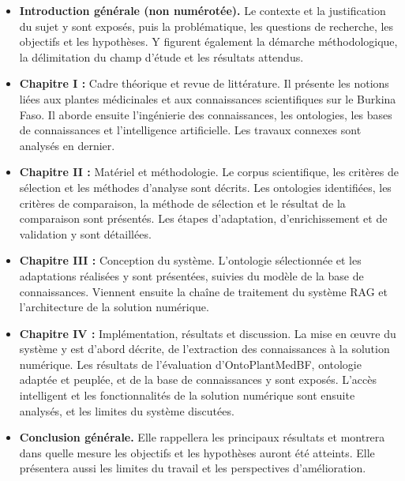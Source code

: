 \begin{itemize}
	\item \textbf{Introduction générale (non numérotée).} Le contexte et la justification du sujet y sont exposés, puis la problématique, les questions de recherche, les objectifs et les hypothèses. Y figurent également la démarche méthodologique, la délimitation du champ d'étude et les résultats attendus.

	\item \textbf{Chapitre I :} Cadre théorique et revue de littérature. Il présente les notions liées aux plantes médicinales et aux connaissances scientifiques sur le Burkina Faso. Il aborde ensuite l'ingénierie des connaissances, les ontologies, les bases de connaissances et l'intelligence artificielle. Les travaux connexes sont analysés en dernier.

	\item \textbf{Chapitre II :} Matériel et méthodologie. Le corpus scientifique, les critères de sélection et les méthodes d'analyse sont décrits. Les ontologies identifiées, les critères de comparaison, la méthode de sélection et le résultat de la comparaison sont présentés. Les étapes d'adaptation, d'enrichissement et de validation y sont détaillées.

	\item \textbf{Chapitre III :} Conception du système. L'ontologie sélectionnée et les adaptations réalisées y sont présentées, suivies du modèle de la base de connaissances. Viennent ensuite la chaîne de traitement du système RAG et l'architecture de la solution numérique.

\item \textbf{Chapitre IV :} Implémentation, résultats et discussion. La mise en œuvre du système y est d'abord décrite, de l'extraction des connaissances à la solution numérique. Les résultats de l'évaluation d'OntoPlantMedBF, ontologie adaptée et peuplée, et de la base de connaissances y sont exposés. L'accès intelligent et les fonctionnalités de la solution numérique sont ensuite analysés, et les limites du système discutées.

\item \textbf{Conclusion générale.} Elle rappellera les principaux résultats et montrera dans quelle mesure les objectifs et les hypothèses auront été atteints. Elle présentera aussi les limites du travail et les perspectives d'amélioration.
\end{itemize}
